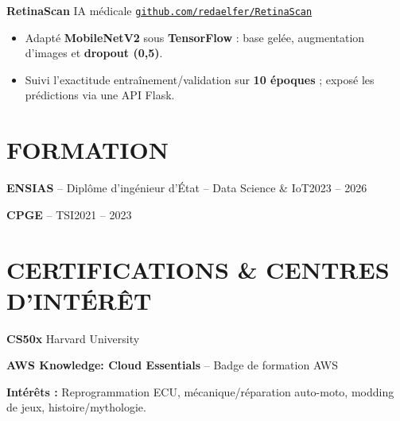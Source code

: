 \documentclass[11pt,a4paper]{article}
\newcommand{\entry}[2]{\noindent #1\hfill #2\par}
\newcommand{\jobgap}{\vspace{5pt}}
\begin{document}
\jobgap
\textbf{RetinaScan} \textbar{} IA médicale \textbar{} \href{https://github.com/redaelfer/RetinaScan}{\nolinkurl{github.com/redaelfer/RetinaScan}}\par
\begin{itemize}
  \item Adapté \textbf{MobileNetV2} sous \textbf{TensorFlow} : base gelée, augmentation d'images et \textbf{dropout (0,5)}.
  \item Suivi l'exactitude entraînement/validation sur \textbf{10 époques} ; exposé les prédictions via une API Flask.
\end{itemize}

\section*{FORMATION}
\entry{\textbf{ENSIAS} -- Diplôme d'ingénieur d'État -- Data Science \& IoT}{2023 -- 2026}
\vspace{3pt}
\entry{\textbf{CPGE} -- TSI}{2021 -- 2023}

\section*{CERTIFICATIONS \& CENTRES D'INTÉRÊT}
\textbf{CS50x} \textbar{} Harvard University\par
\vspace{3pt}
\textbf{AWS Knowledge: Cloud Essentials} -- Badge de formation \textbar{} AWS\par

\vspace{5pt}
\textbf{Intérêts :} Reprogrammation ECU, mécanique/réparation auto-moto, modding de jeux, histoire/mythologie.
\end{document}
